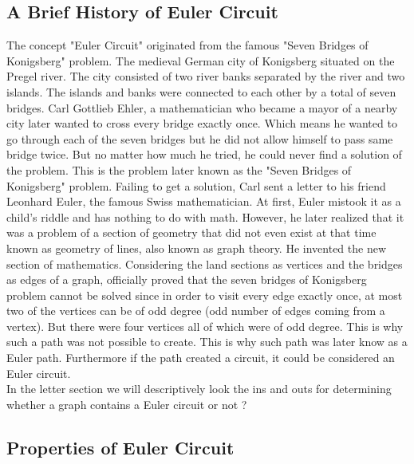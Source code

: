 \documentclass[14pt, times, a4paper]{extarticle}
\begin{document}
\subsection{A Brief History of Euler Circuit}
The concept "Euler Circuit" originated from the famous "Seven Bridges of Konigsberg" problem. The medieval German city of Konigsberg situated on the Pregel river. The city consisted of two river banks separated by the river and two islands. The islands and banks were connected to each other by a total of seven bridges. Carl Gottlieb Ehler, a mathematician who became a mayor of a nearby city later wanted to cross every bridge exactly once. Which means he wanted to go through each of the seven bridges but he did not allow himself to pass same bridge twice. But no matter how much he tried, he could never find a solution of the problem. This is the problem later known as the "\gls{Seven Bridges of Konigsberg}" problem.
Failing to get a solution, Carl sent a letter to his friend Leonhard Euler, the famous Swiss mathematician. At first, Euler mistook it as a child's riddle and has nothing to do with math. However, he later realized that it was a problem of a section of geometry that did not even exist at that time known as geometry of lines, also known as graph theory. He invented the new section of mathematics. Considering the land sections as vertices and the bridges as edges of a graph, officially proved that the seven bridges of Konigsberg problem cannot be solved since in order to visit every edge exactly once, at most two of the vertices can be of odd degree (odd number of edges coming from a vertex). But there were four vertices all of which were of odd degree. This is why such a path was not possible to create. This is why such path was later know as a Euler path. Furthermore if the path created a circuit, it could be considered an Euler circuit. \cite{teded}\\[0.3cm]
In the letter section we will descriptively look the ins and outs for determining whether a graph contains a Euler circuit or not ?

\subsection{Properties of Euler Circuit}
\end{document}
